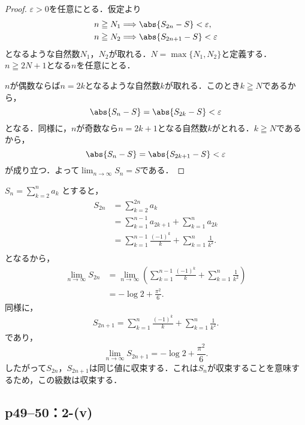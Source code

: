 \begin{proof}
    $\varepsilon >0$を任意にとる．仮定より
    \begin{align*}
         & n \geqq N_1 \Longrightarrow \abs{S_{2n}-S} < \varepsilon,  \\
         & n \geqq N_2 \Longrightarrow \abs{S_{2n+1}-S} < \varepsilon
    \end{align*}
    となるような自然数$N_1$，$N_2$が取れる．$N=\max\{N_1, N_2\}$と定義する．$n \geqq 2N +1$となる$n$を任意にとる．

    $n$が偶数ならば$n =2k$となるような自然数$k$が取れる．このとき$k \geqq N$であるから，
    \[
        \abs{S_n -S}=\abs{S_{2k}-S}<\varepsilon
    \]
    となる．同様に，$n$が奇数なら$n =2k+1$となる自然数$k$がとれる．$k \geqq N$であるから，
    \[
        \abs{S_n -S}=\abs{S_{2k+1}-S}<\varepsilon
    \]
    が成り立つ．よって$\lim_{n \to \infty} S_n =S$である．
\end{proof}

\begin{screen}
    $S_{n} = \sum ^{n}_{k=2} a_k$ とすると，
    \begin{align*}
        S_{2n} & = \sum ^{2n}_{k=2} a_{k}                                              \\
               & = \sum ^{n-1}_{k=1} a_{2k+1} + \sum ^{n}_{k=1} a_{2k}                 \\
               & = \sum ^{n-1}_{k=1} \frac{(-1)^k}{k} + \sum ^{n}_{k=1} \frac{1}{k^2}. \\
    \end{align*}
    となるから，
    \begin{align*}
        \lim_{n \to \infty} S_{2n} & =\lim_{n \to \infty} \left (\sum ^{n-1}_{k=1} \frac{(-1)^k}{k} + \sum ^{n}_{k=1} \frac{1}{k^2} \right ) \\
                                   & = -\log 2 + \frac{\pi^2}{6}.
    \end{align*}
    同様に，
    \begin{align*}
        S_{2n+1} = \sum ^{n}_{k=1} \frac{(-1)^k}{k} + \sum ^{n}_{k=1} \frac{1}{k^2}.
    \end{align*}
    であり，
    \[
        \lim_{n \to \infty} S_{2n+1} = -\log 2 + \frac{\pi^2}{6}.
    \]
    したがって$S_{2n}$，$S_{2n+1}$は同じ値に収束する．これは$S_{n}$が収束することを意味するため，この級数は収束する．
\end{screen}


\subsection*{p49--50：2-(v)}


